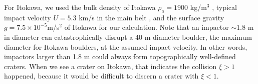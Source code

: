 \documentclass[3p,authoryear]{elsarticle}
\begin{document}
For Itokawa, we used the bulk density of Itokawa $\rho_a=1900$ kg/m$^3$ \citep{fujiwara2006}, typical impact velocity $U=5.3$ km/s in the main belt \citep{bottke1994}, and the surface gravity $g=7.5\times 10^{-5}$m/s$^2$ \citep{tancredi2015} of Itokawa for our calculation.
Note that an impactor $\sim 1.8$ m in diameter can catastrophically disrupt a 40 m-diameter boulder, the maximum diameter for Itokawa boulders, at the assumed impact velocity.
In other words, impactors larger than 1.8 m could always form topographically well-defined craters.
When we see a crater on Itokawa, that indicates the collision $\xi>1$ happened, because it would be difficult to discern a crater with $\xi<1$.
%
%
\end{document}
